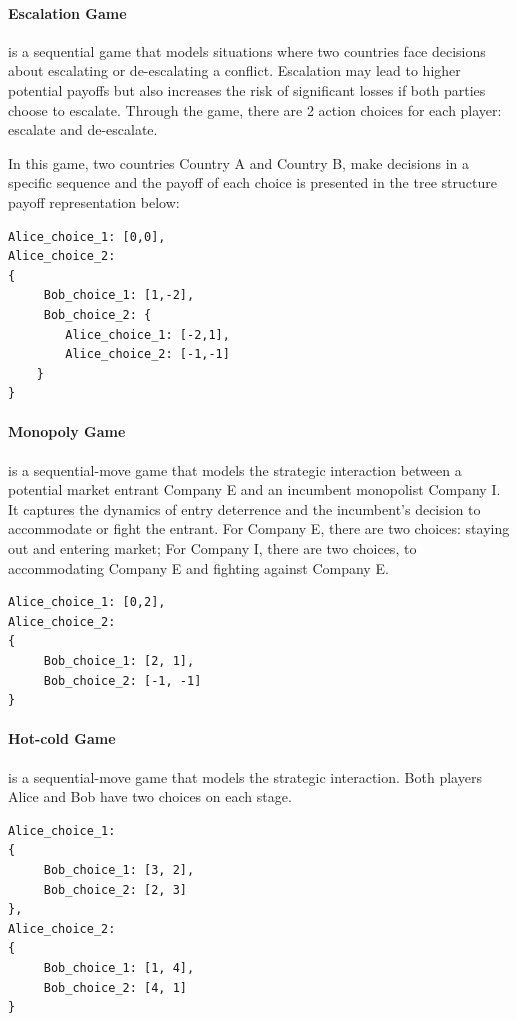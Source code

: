 \paragraph{Escalation Game} is a sequential game that models situations where two countries face decisions about escalating or de-escalating a conflict. Escalation may lead to higher potential payoffs but also increases the risk of significant losses if both parties choose to escalate. Through the game, there are 2 action choices for each player: escalate and de-escalate. 

In this game, two countries Country A and Country B, make decisions in a specific sequence and the payoff of each choice is presented in the tree structure payoff representation below:
\begin{verbatim}
Alice_choice_1: [0,0],
Alice_choice_2: 
{
     Bob_choice_1: [1,-2], 
     Bob_choice_2: {
        Alice_choice_1: [-2,1],
        Alice_choice_2: [-1,-1]
    }
}
\end{verbatim}

\paragraph{Monopoly Game} is a sequential-move game that models the strategic interaction between a potential market entrant Company E and an incumbent monopolist Company I. It captures the dynamics of entry deterrence and the incumbent's decision to accommodate or fight the entrant. For Company E, there are two choices: staying out and entering market; For Company I, there are two choices, to accommodating Company E and fighting against Company E. 

\begin{verbatim}
Alice_choice_1: [0,2],
Alice_choice_2:  
{
     Bob_choice_1: [2, 1], 
     Bob_choice_2: [-1, -1]
}
\end{verbatim}

\paragraph{Hot-cold Game} is a sequential-move game that models the strategic interaction. Both players Alice and Bob have two choices on each stage.

\begin{verbatim}
Alice_choice_1: 
{
     Bob_choice_1: [3, 2], 
     Bob_choice_2: [2, 3]
},
Alice_choice_2: 
{
     Bob_choice_1: [1, 4], 
     Bob_choice_2: [4, 1]
}
\end{verbatim}

